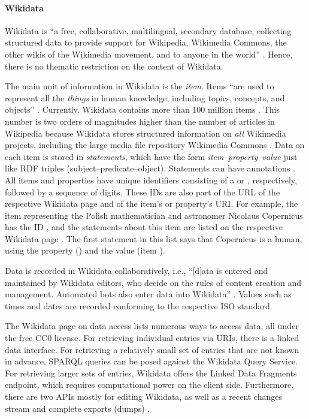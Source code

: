\paragraph{Wikidata}

Wikidata \autocite{Wikidata} is \enquote{a free, collaborative, multilingual, secondary database, collecting structured data to provide support for Wikipedia, Wikimedia Commons, the other wikis of the Wikimedia movement, and to anyone in the world} \autocite{Wikidata_intro}. Hence, there is no thematic restriction
on the content of Wikidata.

The main unit of information in Wikidata is the \emph{item}. Items \enquote{are used to represent all the \emph{things} in human knowledge, including topics, concepts, and objects} \autocite{Wikidata_items}.
Currently, Wikidata contains more than 100 million items \autocite{Wikidata_data_access}.
This number is two orders of magnitudes higher than the number of articles in Wikipedia
because Wikidata stores structured information on \emph{all} Wikimedia projects,
including the large media file repository Wikimedia Commons \autocite[cf.][]{Wikidata_items}.
Data on each item is stored in \emph{statements}, which have the form \emph{item--property--value}
just like \gls{RDF} triples (subject--predicate--object). Statements can have annotations
\autocite[cf.][]{Wikidata_statements}. All items and properties have unique identifiers
consisting of a  or , respectively, followed by a sequence of digits.
These IDs are also part of the URL of the respective Wikidata page
and of the item's or property's URI.
For example, the item representing the 
Polish mathematician and astronomer Nicolaus Copernicus has the ID ,
and the statements about this item are listed on the respective Wikidata page \autocite[cf.][]{Wikidata_Copernicus}.
The first statement in this list says that Copernicus is a human,
using the property  () and the value 
(item ).

Data is recorded in Wikidata collaboratively,
i.e., \enquote{[d]ata is entered and maintained by Wikidata editors, who decide on the rules of content creation and management. Automated bots also enter data into Wikidata}
\autocite{Wikidata_intro}.
Values such as times and dates are recorded conforming to the respective \gls{ISO} standard.

The Wikidata page on data access \autocite{Wikidata_data_access} lists numerous ways to access data,
all under the free CC0 license.
For retrieving individual entries via URIs, there is a linked data interface.
For retrieving a relatively small set of entries that are not known in advance,
SPARQL queries can be posed against the Wikidata Query Service.
For retrieving larger sets of entries, Wikidata offers the Linked Data Fragments endpoint,
which requires computational power on the client side.
Furthermore, there are two APIs mostly for editing Wikidata,
as well as a recent changes stream and complete exports (dumps)
\autocite[cf.][]{Wikidata_data_access}.

